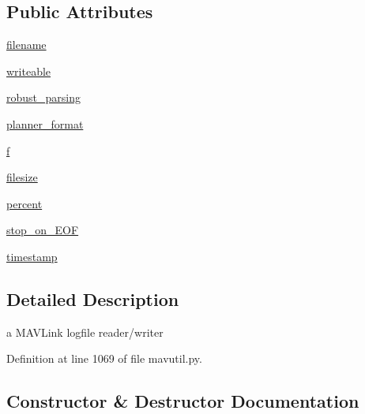 \subsection*{Public Attributes}
\begin{DoxyCompactItemize}
\item 
\mbox{\hyperlink{classpymavlink_1_1mavutil_1_1mavlogfile_a1af91146d60901f4f6f1197693606062}{filename}}
\item 
\mbox{\hyperlink{classpymavlink_1_1mavutil_1_1mavlogfile_ac73cb55ec50193f973c5104a4b893d64}{writeable}}
\item 
\mbox{\hyperlink{classpymavlink_1_1mavutil_1_1mavlogfile_a4022917526709c6bfe69bc66f731532a}{robust\+\_\+parsing}}
\item 
\mbox{\hyperlink{classpymavlink_1_1mavutil_1_1mavlogfile_a68a1a922ff8e2aa75d12820678b40224}{planner\+\_\+format}}
\item 
\mbox{\hyperlink{classpymavlink_1_1mavutil_1_1mavlogfile_a07d6541957a04a31a47469a54b96a094}{f}}
\item 
\mbox{\hyperlink{classpymavlink_1_1mavutil_1_1mavlogfile_abb9c568a2c614e9df71cbd10fb9b556c}{filesize}}
\item 
\mbox{\hyperlink{classpymavlink_1_1mavutil_1_1mavlogfile_a4f9f9b55338387736cbb6affc48f0ac0}{percent}}
\item 
\mbox{\hyperlink{classpymavlink_1_1mavutil_1_1mavlogfile_a43735e374f39058368598926a5e8bfb4}{stop\+\_\+on\+\_\+\+E\+OF}}
\item 
\mbox{\hyperlink{classpymavlink_1_1mavutil_1_1mavlogfile_a3735481f338c7e699a712b93f8aea184}{timestamp}}
\end{DoxyCompactItemize}


\subsection{Detailed Description}
\begin{DoxyVerb}a MAVLink logfile reader/writer\end{DoxyVerb}
 

Definition at line 1069 of file mavutil.\+py.



\subsection{Constructor \& Destructor Documentation}
\mbox{\label{classpymavlink_1_1mavutil_1_1mavlogfile_a78f80cbf0a415f4bda66ef48d2826e6d}} 
